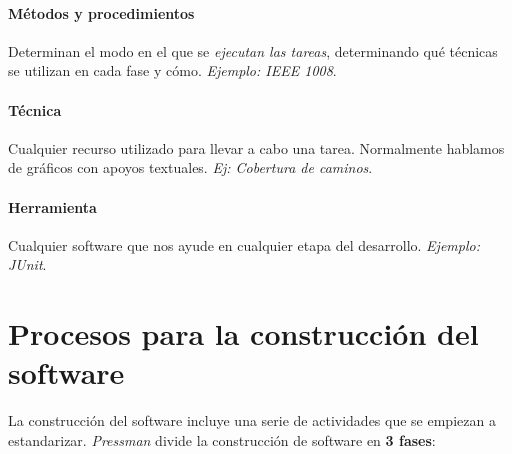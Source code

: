 \paragraph{Métodos y procedimientos} Determinan el modo en el que se \textit{ejecutan las tareas}, determinando qué técnicas se utilizan en cada fase y cómo. \textit{Ejemplo: IEEE 1008}.

\paragraph{Técnica} Cualquier recurso utilizado para llevar a cabo una tarea. Normalmente hablamos de gráficos con apoyos textuales.\textit{ Ej: Cobertura de caminos}.

\paragraph{Herramienta} Cualquier software que nos ayude en cualquier etapa del desarrollo. \textit{Ejemplo: JUnit}.



\section{Procesos para la construcción del software}


La construcción del software incluye una serie de actividades que se empiezan a estandarizar. \textit{Pressman} divide la construcción de software en \textbf{3 fases}:

